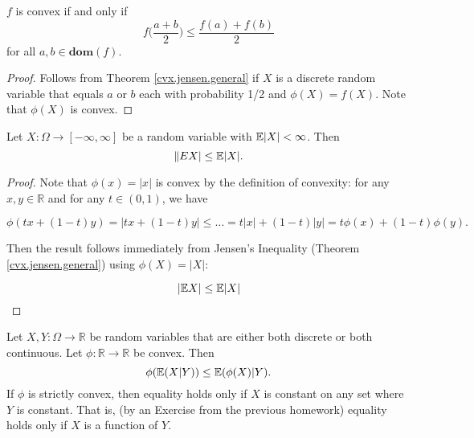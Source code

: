 \begin{corollary}\label{cvx.jensen} \(f\) is convex if and only if
\[
f \bigg(\frac{a+b}{2} \bigg) \leq \frac{f(a) + f(b)}{2} 
\]
for all \(a, b \in \textbf{dom}(f)\). 
\end{corollary}

\begin{proof} Follows from Theorem \ref{cvx.jensen.general} if \(X\) is a discrete random variable that equals \(a\) or \(b\) each with probability 1/2 and \(\phi(X) = f(X)\). Note that \(\phi(X)\) is convex.

\end{proof}

\begin{corollary} Let $X:\Omega\to[-\infty,\infty]$ be a random variable with $\mathbb{E}|X|<\infty$. Then
$$\|E X|\leq\mathbb{E}|X|.$$

\end{corollary}

\begin{proof}Note that \(\phi(x) = |x|\) is convex by the definition of convexity: for any \(x, y \in \mathbb{R}\) and for any \(t \in (0, 1)\), we have

\[
\phi(tx+(1-t)y) = |tx + (1-t)y| \leq \ldots =  t|x|+(1-t)|y| =  t\phi(x)+(1-t)\phi(y).
\]

Then the result follows immediately from Jensen's Inequality (Theorem \ref{cvx.jensen.general}) using \(\phi(X) = |X|\):

\[
|\mathbb{E} X| \leq \mathbb{E} |X|
\]

\end{proof}

\begin{theorem}\label{cvx.541A.exercise5.89}
Let $X,Y:\Omega\to\mathbb{R}$ be random variables that are either both discrete or both continuous.  Let $\phi : \mathbb{R} \to \mathbb{R}$ be convex.  Then
$$\phi(\mathbb{E}( X|Y))\leq \mathbb{E}( \phi(X)|Y).$$
If $\phi$ is strictly convex, then equality holds only if $X$ is constant on any set where $Y$ is constant.  That is, (by an Exercise from the previous homework) equality holds only if $X$ is a function of $Y$.

\end{theorem}

